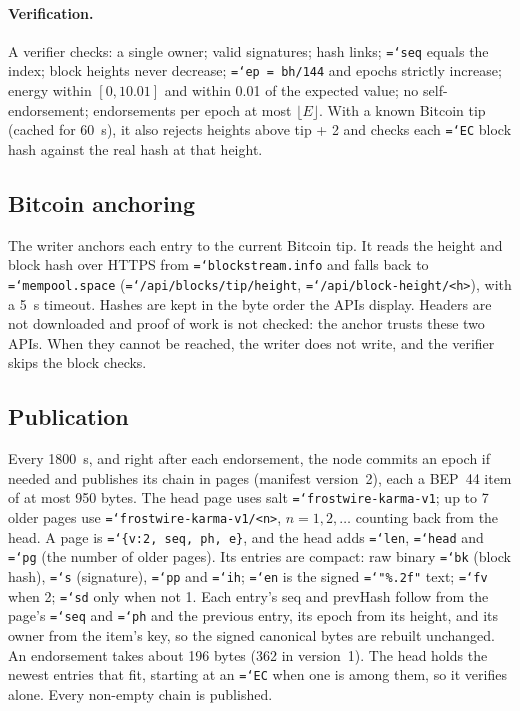 \documentclass[11pt,a4paper]{article}
\newcommand{\code}[1]{\texttt{\hyphenchar\font=`\-\relax #1}}
\DeclareRobustCommand{\_}{\origunderscore\allowbreak}
\begin{document}
\paragraph{Verification.} A verifier checks: a single owner; valid signatures; hash links;
\code{seq} equals the index; block heights never decrease; \code{ep = bh/144} and epochs
strictly increase; energy within $[0, 10.01]$ and within 0.01 of the expected value; no
self-endorsement; endorsements per epoch at most $\lfloor E \rfloor$. With a known Bitcoin tip
(cached for 60~s), it also rejects heights above tip + 2 and checks each \code{EC} block hash
against the real hash at that height.

\subsection{Bitcoin anchoring}
The writer anchors each entry to the current Bitcoin tip. It reads the height and block hash
over HTTPS from \code{blockstream.info} and falls back to \code{mempool.space}
(\code{/api/blocks/tip/height}, \code{/api/block-height/<h>}), with a 5~s timeout. Hashes are
kept in the byte order the APIs display. Headers are not downloaded and proof of work is not
checked: the anchor trusts these two APIs. When they cannot be reached, the writer does not
write, and the verifier skips the block checks.

\subsection{Publication}
Every 1800~s, and right after each endorsement, the node commits an epoch if needed and
publishes its chain in pages (manifest version~2), each a BEP~44 item of at most 950 bytes. The
head page uses salt \code{frostwire-karma-v1}; up to 7 older pages use
\code{frostwire-karma-v1/<n>}, $n = 1, 2, \ldots$ counting back from the head. A page is
\code{\{v:2, seq, ph, e\}}, and the head adds \code{len}, \code{head} and \code{pg} (the number
of older pages). Its entries are compact: raw binary \code{bk} (block hash), \code{s}
(signature), \code{pp} and \code{ih}; \code{en} is the signed \code{"\%.2f"} text; \code{fv}
when 2; \code{sd} only when not 1. Each entry's seq and prevHash follow from the page's
\code{seq} and \code{ph} and the previous entry, its epoch from its height, and its owner from
the item's key, so the signed canonical bytes are rebuilt unchanged. An endorsement takes about
196 bytes (362 in version~1). The head holds the newest entries that fit, starting at an
\code{EC} when one is among them, so it verifies alone. Every non-empty chain is published.
\end{document}
